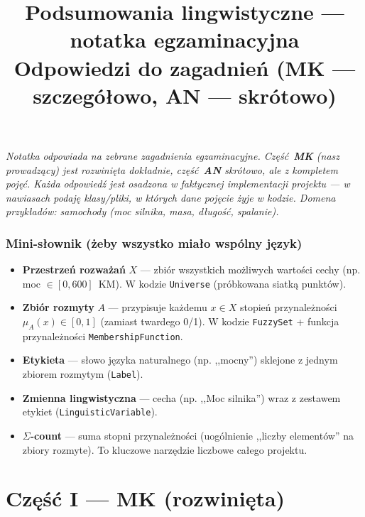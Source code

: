 \documentclass[11pt]{article}
\title{Podsumowania lingwistyczne --- notatka egzaminacyjna\\[3pt]
\large Odpowiedzi do zagadnień (MK --- szczegółowo, AN --- skrótowo)}
\author{}
\date{}
\newcommand{\code}[1]{\texttt{#1}}
\begin{document}
\maketitle

\noindent\textit{Notatka odpowiada na zebrane zagadnienia egzaminacyjne. Część~\textbf{MK}
(nasz prowadzący) jest rozwinięta dokładnie, część~\textbf{AN} skrótowo, ale z kompletem
pojęć. Każda odpowiedź jest osadzona w faktycznej implementacji projektu --- w nawiasach
podaję klasy/pliki, w których dane pojęcie żyje w kodzie. Domena przykładów: samochody
(moc silnika, masa, długość, spalanie).}

\tableofcontents

\section*{Mini-słownik (żeby wszystko miało wspólny język)}

\begin{itemize}[leftmargin=*]
\item \textbf{Przestrzeń rozważań} $X$ --- zbiór wszystkich możliwych wartości cechy
  (np. moc $\in [0, 600]$~KM). W kodzie \code{Universe} (próbkowana siatką punktów).
\item \textbf{Zbiór rozmyty} $A$ --- przypisuje każdemu $x\in X$ stopień przynależności
  $\mu_A(x)\in[0,1]$ (zamiast twardego 0/1). W kodzie \code{FuzzySet} + funkcja
  przynależności \code{MembershipFunction}.
\item \textbf{Etykieta} --- słowo języka naturalnego (np. ,,mocny'') sklejone z jednym
  zbiorem rozmytym (\code{Label}).
\item \textbf{Zmienna lingwistyczna} --- cecha (np. ,,Moc silnika'') wraz z zestawem
  etykiet (\code{LinguisticVariable}).
\item \textbf{$\Sigma$-count} --- suma stopni przynależności (uogólnienie ,,liczby
  elementów'' na zbiory rozmyte). To kluczowe narzędzie liczbowe całego projektu.
\end{itemize}

\part*{Część I --- MK (rozwinięta)}
\end{document}

